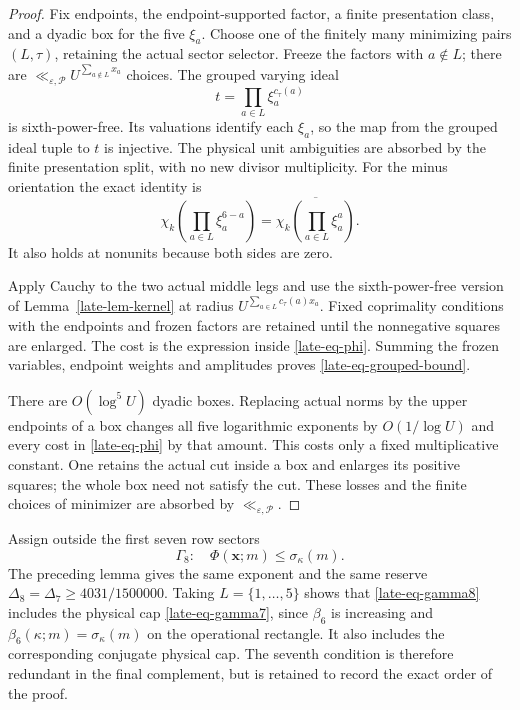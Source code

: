 \documentclass[11pt]{article}
\theoremstyle{definition}
\newcommand{\eps}{\varepsilon}
\newcommand{\lls}{\ll_{\eps,\mathcal P}}
\begin{document}
\begin{proof}
Fix endpoints, the endpoint-supported factor, a finite presentation
class, and a dyadic box for the five $\xi_a$.  Choose one of the
finitely many minimizing pairs $(L,\tau)$, retaining the actual
sector selector.  Freeze the factors with $a\notin L$; there are
$\lls U^{\sum_{a\notin L}x_a}$ choices.  The grouped varying ideal
\[
 t=\prod_{a\in L}\xi_a^{c_\tau(a)}
\]
is sixth-power-free.  Its valuations identify each $\xi_a$, so the map
from the grouped ideal tuple to $t$ is injective.  The physical unit
ambiguities are absorbed by the finite presentation split, with no
new divisor multiplicity.  For the minus orientation the exact
identity is
\[
 \chi_k\left(\prod_{a\in L}\xi_a^{6-a}\right)
     =\overline{\chi_k\left(\prod_{a\in L}\xi_a^a\right)}.
\]
It also holds at nonunits because both sides are zero.

Apply Cauchy to the two actual middle legs and use the sixth-power-free
version of Lemma~\ref{late-lem-kernel} at radius
$U^{\sum_{a\in L}c_\tau(a)x_a}$.  Fixed coprimality conditions with
the endpoints and frozen factors are retained until the nonnegative
squares are enlarged.  The cost is the expression inside
\eqref{late-eq-phi}.  Summing the frozen variables, endpoint weights
and amplitudes proves \eqref{late-eq-grouped-bound}.

There are $O(\log^5 U)$ dyadic boxes.  Replacing actual norms by the
upper endpoints of a box changes all five logarithmic exponents by
$O(1/\log U)$ and every cost in \eqref{late-eq-phi} by that amount.
This costs only a fixed multiplicative constant.  One retains the
actual cut inside a box and enlarges its positive squares; the whole
box need not satisfy the cut.  These losses and the finite choices of
minimizer are absorbed by $\lls$.
\end{proof}

Assign outside the first seven row sectors
\begin{equation}
 \Gamma_8:\quad \Phi(\boldsymbol x;m)\le\sigma_\kappa(m).
 \label{late-eq-gamma8}
\end{equation}
The preceding lemma gives the same exponent and the same reserve
$\Delta_8=\Delta_7\ge4031/1500000$.  Taking $L=\{1,\ldots,5\}$
shows that \eqref{late-eq-gamma8} includes the physical cap
\eqref{late-eq-gamma7}, since $\beta_6$ is increasing and
$\beta_6(\kappa;m)=\sigma_\kappa(m)$ on the operational rectangle.
It also includes the corresponding conjugate physical cap.  The
seventh condition is therefore redundant in the final complement,
but is retained to record the exact order of the proof.
\end{document}
